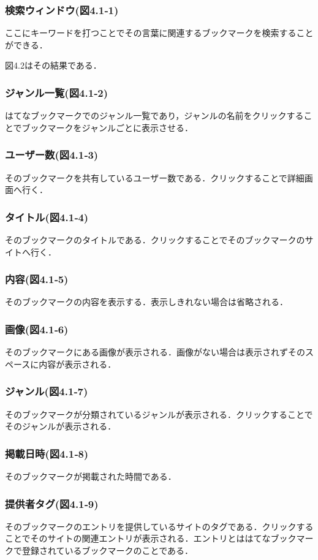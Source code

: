 \subsubsection{検索ウィンドウ(図4.1‐1)}
ここにキーワードを打つことでその言葉に関連するブックマークを検索することができる．\par
図4.2はその結果である．
\subsubsection{ジャンル一覧(図4.1‐2)}
はてなブックマークでのジャンル一覧であり，ジャンルの名前をクリックすることでブックマークをジャンルごとに表示させる．
\subsubsection{ユーザー数(図4.1‐3)}
そのブックマークを共有しているユーザー数である．クリックすることで詳細画面へ行く．
\subsubsection{タイトル(図4.1‐4)}
そのブックマークのタイトルである．クリックすることでそのブックマークのサイトへ行く．
\subsubsection{内容(図4.1‐5)}
そのブックマークの内容を表示する．表示しきれない場合は省略される．
\subsubsection{画像(図4.1‐6)}
そのブックマークにある画像が表示される．画像がない場合は表示されずそのスペースに内容が表示される．
\subsubsection{ジャンル(図4.1‐7)}
そのブックマークが分類されているジャンルが表示される．クリックすることでそのジャンルが表示される．
\subsubsection{掲載日時(図4.1‐8)}
そのブックマークが掲載された時間である．
\subsubsection{提供者タグ(図4.1‐9)}
そのブックマークのエントリを提供しているサイトのタグである．クリックすることでそのサイトの関連エントリが表示される．エントリとははてなブックマークで登録されているブックマークのことである．
